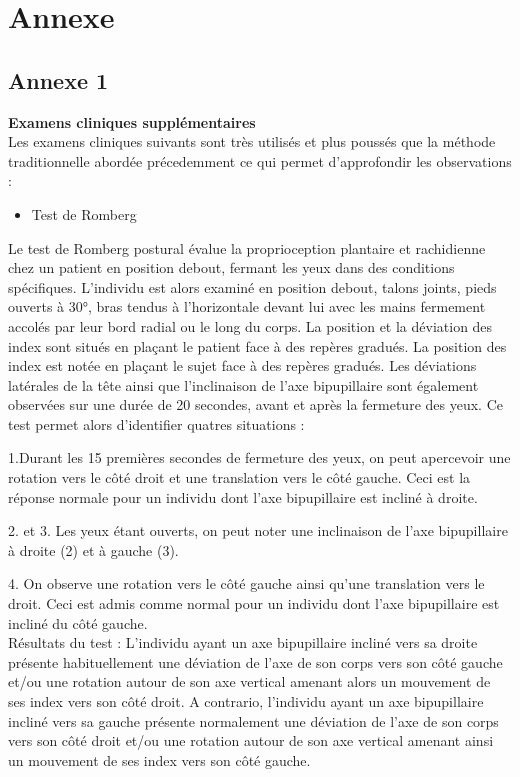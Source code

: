 \section{Annexe}

\subsection{Annexe 1}

\textbf{Examens cliniques supplémentaires}\\ 

Les examens cliniques suivants sont très utilisés et plus poussés que la méthode traditionnelle abordée précedemment ce
qui permet d'approfondir les observations :

\begin{itemize}
    \item Test de Romberg
\end{itemize}

Le test de Romberg postural évalue la proprioception plantaire et rachidienne chez un patient en position debout, fermant les yeux dans des conditions spécifiques.  L’individu est alors examiné en position debout, talons joints, pieds ouverts à 30°, bras tendus à l'horizontale devant lui avec les mains fermement accolés par leur bord radial ou le long du corps.  La position et la déviation des index sont situés en plaçant le patient face à des repères gradués. La position des index est notée en plaçant le sujet face à des repères gradués. Les déviations latérales de la tête ainsi que l’inclinaison de l’axe bipupillaire sont également observées sur une durée de 20 secondes, avant et après la fermeture des yeux.
Ce test permet alors d’identifier quatres situations : 

1.Durant les 15 premières secondes de fermeture des yeux, on peut apercevoir une rotation vers le côté droit et une translation vers le côté gauche. Ceci est la réponse normale pour un individu dont l’axe bipupillaire est incliné à droite.

2. et 3.  Les yeux étant ouverts, on peut noter une inclinaison de l’axe bipupillaire à droite (2) et à gauche (3).

4. On observe une rotation vers le côté gauche ainsi qu’une translation vers le droit. Ceci est admis comme normal pour un individu dont l’axe bipupillaire est incliné du côté gauche.\\

Résultats du test : 
L’individu ayant un axe bipupillaire incliné vers sa droite présente habituellement une déviation de l’axe de son corps vers son côté gauche et/ou une rotation autour de son axe vertical amenant alors un mouvement de ses index vers son côté droit.
A contrario, l’individu ayant un axe bipupillaire incliné vers sa gauche présente normalement une déviation de l’axe de son corps vers son côté droit et/ou une rotation autour de son axe vertical amenant ainsi un mouvement de ses index vers son côté gauche.

